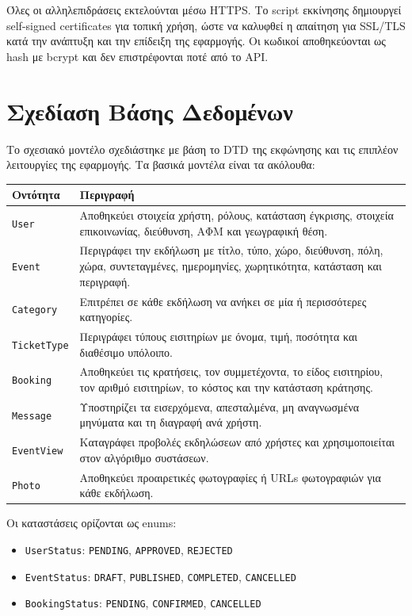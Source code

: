 \documentclass[11pt,a4paper]{article}
\newcommand{\code}[1]{\texttt{#1}}
\begin{document}
Όλες οι αλληλεπιδράσεις εκτελούνται μέσω HTTPS. Το script εκκίνησης δημιουργεί
self-signed certificates για τοπική χρήση, ώστε να καλυφθεί η απαίτηση για SSL/TLS κατά
την ανάπτυξη και την επίδειξη της εφαρμογής. Οι κωδικοί αποθηκεύονται ως hash με
bcrypt και δεν επιστρέφονται ποτέ από το API.

\section{Σχεδίαση Βάσης Δεδομένων}

Το σχεσιακό μοντέλο σχεδιάστηκε με βάση το DTD της εκφώνησης και τις επιπλέον
λειτουργίες της εφαρμογής. Τα βασικά μοντέλα είναι τα ακόλουθα:

\begin{center}
\begin{tabularx}{\textwidth}{@{}l X@{}}
  \toprule
  \textbf{Οντότητα} & \textbf{Περιγραφή} \\
  \midrule
  \code{User} & Αποθηκεύει στοιχεία χρήστη, ρόλους, κατάσταση έγκρισης, στοιχεία
    επικοινωνίας, διεύθυνση, ΑΦΜ και γεωγραφική θέση. \\
  \code{Event} & Περιγράφει την εκδήλωση με τίτλο, τύπο, χώρο, διεύθυνση, πόλη, χώρα,
    συντεταγμένες, ημερομηνίες, χωρητικότητα, κατάσταση και περιγραφή. \\
  \code{Category} & Επιτρέπει σε κάθε εκδήλωση να ανήκει σε μία ή περισσότερες
    κατηγορίες. \\
  \code{TicketType} & Περιγράφει τύπους εισιτηρίων με όνομα, τιμή, ποσότητα και
    διαθέσιμο υπόλοιπο. \\
  \code{Booking} & Αποθηκεύει τις κρατήσεις, τον συμμετέχοντα, το είδος εισιτηρίου, τον
    αριθμό εισιτηρίων, το κόστος και την κατάσταση κράτησης. \\
  \code{Message} & Υποστηρίζει τα εισερχόμενα, απεσταλμένα, μη αναγνωσμένα μηνύματα και
    τη διαγραφή ανά χρήστη. \\
  \code{EventView} & Καταγράφει προβολές εκδηλώσεων από χρήστες και χρησιμοποιείται
    στον αλγόριθμο συστάσεων. \\
  \code{Photo} & Αποθηκεύει προαιρετικές φωτογραφίες ή URLs φωτογραφιών για κάθε
    εκδήλωση. \\
  \bottomrule
\end{tabularx}
\end{center}

Οι καταστάσεις ορίζονται ως enums:
\begin{itemize}
  \item \code{UserStatus}: \code{PENDING}, \code{APPROVED}, \code{REJECTED}
  \item \code{EventStatus}: \code{DRAFT}, \code{PUBLISHED}, \code{COMPLETED}, \code{CANCELLED}
  \item \code{BookingStatus}: \code{PENDING}, \code{CONFIRMED}, \code{CANCELLED}
\end{itemize}
\end{document}

